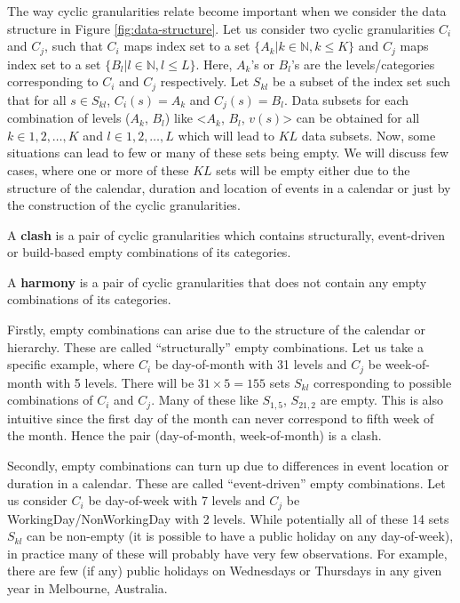 \documentclass[12pt]{article}
\begin{document}
The way cyclic granularities relate become important when we consider the data structure in Figure \ref{fig:data-structure}. Let us consider two cyclic granularities \(C_i\) and \(C_j\), such that \(C_i\) maps index set to a set \(\{A_k | k \in \mathbb{N}, k \leq K\}\) and \(C_j\) maps index set to a set \(\{B_l | l \in \mathbb{N}, l \leq L\}\). Here, \(A_k\)'s or \(B_l\)'s are the levels/categories corresponding to \(C_i\) and \(C_j\) respectively. Let \(S_{kl}\) be a subset of the index set such that for all \(s \in S_{kl}\), \(C_i(s) = A_k\) and \(C_j(s) = B_l\). Data subsets for each combination of levels (\(A_k\), \(B_l\)) like \textless{}\(A_k\), \(B_l\), \(v(s)\)\textgreater{} can be obtained for all \(k \in {1, 2, \dots, K}\) and \(l \in {1, 2, \dots, L}\) which will lead to \(KL\) data subsets. Now, some situations can lead to few or many of these sets being empty. We will discuss few cases, where one or more of these \(KL\) sets will be empty either due to the structure of the calendar, duration and location of events in a calendar or just by the construction of the cyclic granularities.

\begin{definition}\label{def:harmony}
A {\bf clash} is a pair of cyclic granularities which contains structurally, event-driven or build-based empty combinations of its categories.
\end{definition}

\begin{definition}\label{def:clash}
A {\bf harmony} is a pair of cyclic granularities that does not contain any empty combinations of its categories.
\end{definition}

\noindent Firstly, empty combinations can arise due to the structure of the calendar or hierarchy. These are called ``structurally'' empty combinations. Let us take a specific example, where \(C_i\) be day-of-month with 31 levels and \(C_j\) be week-of-month with 5 levels. There will be \(31\times 5=155\) sets \(S_{kl}\) corresponding to possible combinations of \(C_i\) and \(C_j\). Many of these like \(S_{1,5}\), \(S_{21,2}\) are empty. This is also intuitive since the first day of the month can never correspond to fifth week of the month. Hence the pair (day-of-month, week-of-month) is a clash.

\noindent Secondly, empty combinations can turn up due to differences in event location or duration in a calendar. These are called ``event-driven'' empty combinations. Let us consider \(C_i\) be day-of-week with 7 levels and \(C_j\) be WorkingDay/NonWorkingDay with 2 levels. While potentially all of these 14 sets \(S_{kl}\) can be non-empty (it is possible to have a public holiday on any day-of-week), in practice many of these will probably have very few observations. For example, there are few (if any) public holidays on Wednesdays or Thursdays in any given year in Melbourne, Australia.
\end{document}
